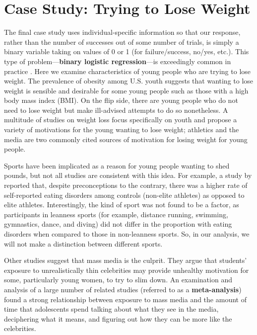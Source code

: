 \documentclass[
]{krantz}
\begin{document}
\hypertarget{case-study-trying-to-lose-weight}{%
\section{Case Study: Trying to Lose Weight}\label{case-study-trying-to-lose-weight}}

The final case study uses individual-specific information so that our response, rather than the number of successes out of some number of trials, is simply a binary variable taking on values of 0 or 1 (for failure/success, no/yes, etc.). This type of problem---\textbf{binary logistic regression}---is exceedingly common in practice . Here we examine characteristics of young people who are trying to lose weight. The prevalence of obesity among U.S. youth suggests that wanting to lose weight is sensible and desirable for some young people such as those with a high body mass index (BMI). On the flip side, there are young people who do not need to lose weight but make ill-advised attempts to do so nonetheless. A multitude of studies on weight loss focus specifically on youth and propose a variety of motivations for the young wanting to lose weight; athletics and the media are two commonly cited sources of motivation for losing weight for young people.

Sports have been implicated as a reason for young people wanting to shed pounds, but not all studies are consistent with this idea. For example, a study by \citet{Martinsen2009} reported that, despite preconceptions to the contrary, there was a higher rate of self-reported eating disorders among controls (non-elite athletes) as opposed to elite athletes. Interestingly, the kind of sport was not found to be a factor, as participants in leanness sports (for example, distance running, swimming, gymnastics, dance, and diving) did not differ in the proportion with eating disorders when compared to those in non-leanness sports. So, in our analysis, we will not make a distinction between different sports.

Other studies suggest that mass media is the culprit. They argue that students' exposure to unrealistically thin celebrities may provide unhealthy motivation for some, particularly young women, to try to slim down. An examination and analysis of a large number of related studies (referred to as a \textbf{meta-analysis}) \citep{Grabe2008} found a strong relationship between exposure to mass media and the amount of time that adolescents spend talking about what they see in the media, deciphering what it means, and figuring out how they can be more like the celebrities.
\end{document}
